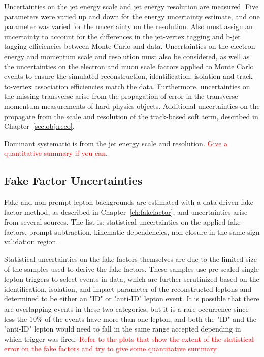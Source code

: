 Uncertainties on the jet energy scale and jet energy resolution are measured.  Five parameters were varied up and down for the energy uncertainty estimate, and one parameter was varied for the uncertainty on the resolution.  Also must assign an uncertainty to account for the differences in the jet-vertex tagging and b-jet tagging efficiencies between Monte Carlo and data. Uncertainties on the electron energy and momentum scale and resolution must also be considered, as well as the uncertainties on the electron and muon scale factors applied to Monte Carlo events to ensure the simulated reconstruction, identification, isolation and track-to-vertex association efficiencies match the data.  Furthermore, uncertainties on the missing transverse arise from the propagation of error in the transverse momentum measurements of hard physics objects.  Additional uncertainties on the \met propagate from the scale and resolution of the track-based soft term, described in Chapter~\ref{sec:obj:reco}.

Dominant systematic is from the jet energy scale and resolution. \textcolor{red}{Give a quantitative summary if you can}.

\subsection{Fake Factor Uncertainties}
Fake and non-prompt lepton backgrounds are estimated with a data-driven fake factor method, as described in Chapter~\ref{ch:fakefactor}, and uncertainties arise from several sources.  The list is: statistical uncertainties on the applied fake factors, prompt subtraction, kinematic dependencies, non-closure in the same-sign validation region.

Statistical uncertainties on the fake factors themselves are due to the limited size of the samples used to derive the fake factors.  These samples use pre-scaled single lepton triggers to select events in data, which are further scrutinized based on the identification, isolation, and impact parameter of the reconstructed leptons and determined to be either an "ID" or "anti-ID" lepton event.  It is possible that there are overlapping events in these two categories, but it is a rare occurrence since less the $10\%$ of the events have more than one lepton, and both the "ID" and the "anti-ID" lepton would need to fall in the same \pt range accepted depending in which trigger was fired.  \textcolor{red}{Refer to the plots that show the extent of the statistical error on the fake factors and try to give some quantitative summary}.

